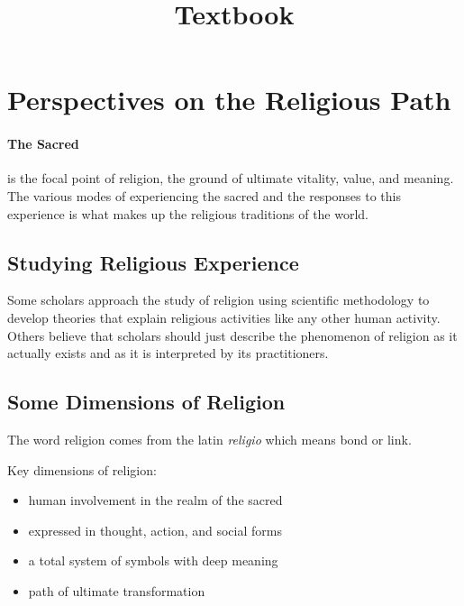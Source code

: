\documentclass{article}
\begin{document}
\title{Textbook}
\maketitle
\section{Perspectives on the Religious Path}
\label{sec:perspectives_on_the_religious_path}

\paragraph{The Sacred}
\label{par:the_sacred}
is the focal point of religion, the ground of ultimate vitality, value, and meaning. The various modes of experiencing the sacred and the responses to this experience is what makes up the religious traditions of the world.

\subsection{Studying Religious Experience}
\label{sub:studying_religious_experience}
Some scholars approach the study of religion using scientific methodology to develop theories that explain religious activities like any other human activity. Others believe that scholars should just describe the phenomenon of religion as it actually exists and as it is interpreted by its practitioners.

\subsection{Some Dimensions of Religion}
\label{sub:some_dimensions_of_religion}
The word religion comes from the latin \emph{religio} which means bond or link.

Key dimensions of religion:
\begin{itemize}
	\item human involvement in the realm of the sacred
	\item expressed in thought, action, and social forms
	\item a total system of symbols with deep meaning
	\item path of ultimate transformation
\end{itemize}
\end{document}
